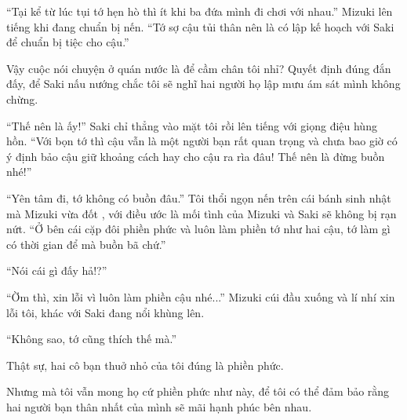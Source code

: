 {``Tại kể từ lúc tụi tớ hẹn hò thì ít khi ba đứa mình đi chơi với nhau.''
Mizuki lên tiếng khi đang chuẩn bị nến. ``Tớ sợ cậu tủi thân nên là có
lập kế hoạch với Saki để chuẩn bị tiệc cho cậu.''

Vậy cuộc nói chuyện ở quán nước là để cầm chân tôi nhỉ? Quyết định đúng
đắn đấy, để Saki nấu nướng chắc tôi sẽ nghĩ hai người họ lập mưu ám sát
mình không chừng.

``Thế nên là ấy!'' Saki chỉ thẳng vào mặt tôi rồi lên tiếng với giọng
điệu hùng hồn. ``Với bọn tớ thì cậu vẫn là một người bạn rất quan trọng
và chưa bao giờ có ý định bảo cậu giữ khoảng cách hay cho cậu ra rìa
đâu! Thế nên là đừng buồn nhé!''

``Yên tâm đi, tớ không có buồn đâu.'' Tôi thổi ngọn nến trên cái bánh
sinh nhật mà Mizuki vừa đốt , với điều ước là mối tình của Mizuki và
Saki sẽ không bị rạn nứt. ``Ở bên cái cặp đôi phiền phức và luôn làm
phiền tớ như hai cậu, tớ làm gì có thời gian để mà buồn bã chứ.''

``Nói cái gì đấy hả!?''

``Ờm thì, xin lỗi vì luôn làm phiền cậu nhé...'' Mizuki cúi đầu xuống và
lí nhí xin lỗi tôi, khác với Saki đang nổi khùng lên.

``Không sao, tớ cũng thích thế mà.''

Thật sự, hai cô bạn thuở nhỏ của tôi đúng là phiền phức.

Nhưng mà tôi vẫn mong họ cứ phiền phức như này, để tôi có thể đảm bảo
rằng hai người bạn thân nhất của mình sẽ mãi hạnh phúc bên nhau.
}